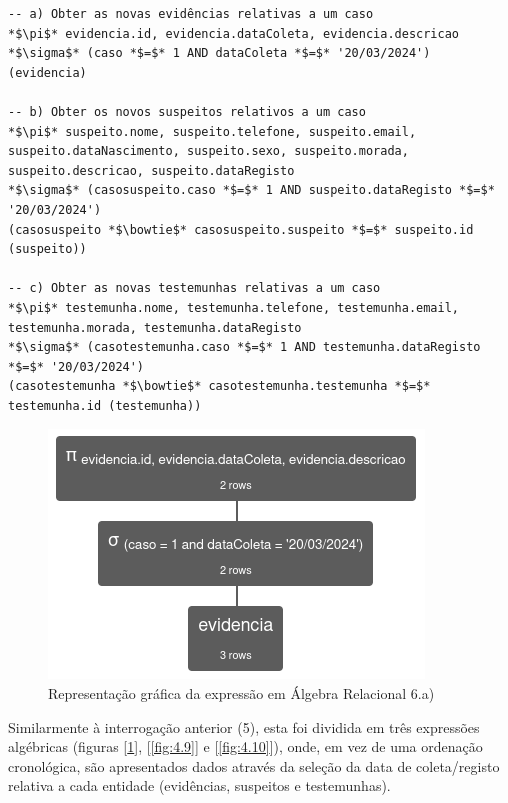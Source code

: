 \documentclass[a4paper,12pt]{scrreprt}
\begin{document}
\begin{lstlisting}[escapechar=*]
-- a) Obter as novas evidências relativas a um caso
*$\pi$* evidencia.id, evidencia.dataColeta, evidencia.descricao
*$\sigma$* (caso *$=$* 1 AND dataColeta *$=$* '20/03/2024') (evidencia)

-- b) Obter os novos suspeitos relativos a um caso
*$\pi$* suspeito.nome, suspeito.telefone, suspeito.email, suspeito.dataNascimento, suspeito.sexo, suspeito.morada, suspeito.descricao, suspeito.dataRegisto
*$\sigma$* (casosuspeito.caso *$=$* 1 AND suspeito.dataRegisto *$=$* '20/03/2024')
(casosuspeito *$\bowtie$* casosuspeito.suspeito *$=$* suspeito.id (suspeito))

-- c) Obter as novas testemunhas relativas a um caso
*$\pi$* testemunha.nome, testemunha.telefone, testemunha.email, testemunha.morada, testemunha.dataRegisto
*$\sigma$* (casotestemunha.caso *$=$* 1 AND testemunha.dataRegisto *$=$* '20/03/2024')
(casotestemunha *$\bowtie$* casotestemunha.testemunha *$=$* testemunha.id (testemunha))
\end{lstlisting}

\begin{figure}[!ht]
    \centering
    \includegraphics[scale=0.9]{images/relax/6-a.png}
    \caption{Representação gráfica da expressão em Álgebra Relacional 6.a)}
    \label{fig:4.8}
\end{figure}

\clearpage

Similarmente à interrogação anterior (5), esta foi dividida em três expressões algébricas (figuras [\ref{fig:4.8}], [\ref{fig:4.9}] e [\ref{fig:4.10}]), onde, em vez de uma ordenação cronológica, são apresentados dados através da seleção da data de coleta/registo relativa a cada entidade (evidências, suspeitos e testemunhas).
\end{document}
